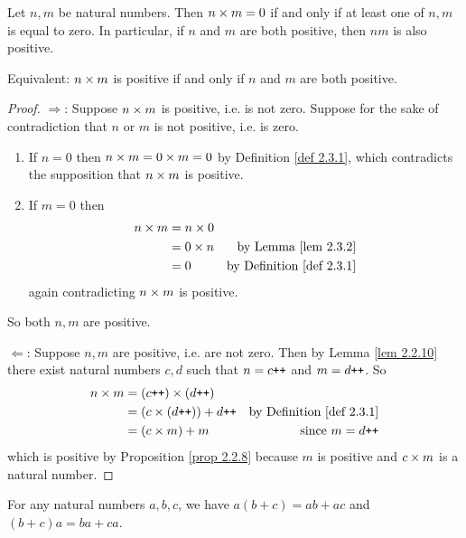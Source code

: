 \begin{lemma}\label{lem 2.3.3}
Let \(n, m\) be natural numbers. Then \(n \times m = 0\) if and only if at least one of \(n, m\) is equal to zero. In particular, if \(n\) and \(m\) are both positive, then \(nm\) is also positive.
\end{lemma}
\begin{note}
Equivalent: \(n \times m\) is positive if and only if \(n\) and \(m\) are both positive.
\end{note}
\begin{proof}

\(\Longrightarrow\): Suppose \(n \times m\) is positive, i.e. is not zero. Suppose for the sake of contradiction that \(n\) or \(m\) is not positive, i.e. is zero.
\begin{enumerate}
    \item If \(n = 0\) then \(n \times m = 0 \times m = 0\) by Definition \ref{def 2.3.1}, which contradicts the supposition that \(n \times m\) is positive.
    \item If \(m = 0\) then
    \begin{align*}
        n \times m & = n \times 0 \\
               & = 0 \times n & \text{by Lemma \ref{lem 2.3.2}} \\
               & = 0 & \text{by Definition \ref{def 2.3.1}}
    \end{align*}
    again contradicting \(n \times m\) is positive.
\end{enumerate}
So both \(n, m\) are positive.

\(\Longleftarrow\): Suppose \(n, m\) are positive, i.e. are not zero. Then by Lemma \ref{lem 2.2.10} there exist natural numbers \(c, d\) such that \(n = c\texttt{++}\) and \(m = d\texttt{++}\). So
\begin{align*}
    n \times m & = (c\texttt{++}) \times (d\texttt{++}) \\
           & = (c \times (d\texttt{++})) + d\texttt{++} & \text{by Definition \ref{def 2.3.1}} \\
           & = (c \times m) + m & \text{since \(m = d\texttt{++}\)} \\
\end{align*}
which is positive by Proposition \ref{prop 2.2.8} because \(m\) is positive and \(c \times m\) is a natural number.
\end{proof}

\begin{proposition}\label{prop 2.3.4}
For any natural numbers \(a, b, c\), we have \(a(b + c)= ab + ac\) and \((b + c)a = ba + ca\).
\end{proposition}

